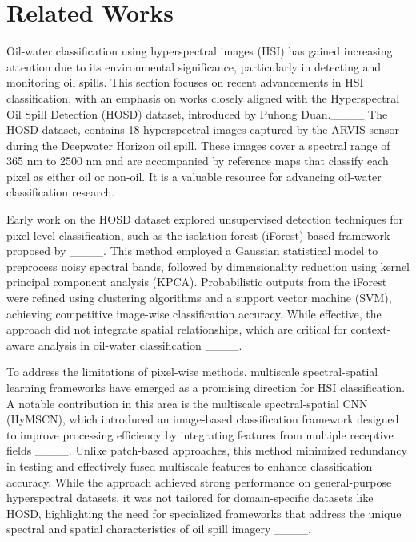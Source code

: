 \section{Related Works}
Oil-water classification using hyperspectral images (HSI) has gained increasing attention due to its environmental significance, particularly in detecting and monitoring oil spills. This section focuses on recent advancements in HSI classification, with an emphasis on works closely aligned with the Hyperspectral Oil Spill Detection (HOSD) dataset, introduced by Puhong Duan.____
\newline
The HOSD dataset, contains 18 hyperspectral images captured by the ARVIS sensor during the Deepwater Horizon oil spill. These images cover a spectral range of 365 nm to 2500 nm and are accompanied by reference maps that classify each pixel as either oil or non-oil. It is a valuable resource for advancing oil-water classification research.

Early work on the HOSD dataset explored unsupervised detection techniques for pixel level classification, such as the isolation forest (iForest)-based framework proposed by ____. This method employed a Gaussian statistical model to preprocess noisy spectral bands, followed by dimensionality reduction using kernel principal component analysis (KPCA). Probabilistic outputs from the iForest were refined using clustering algorithms and a support vector machine (SVM), achieving competitive image-wise classification accuracy. While effective, the approach did not integrate spatial relationships, which are critical for context-aware analysis in oil-water classification ____.

To address the limitations of pixel-wise methods, multiscale spectral-spatial learning frameworks have emerged as a promising direction for HSI classification. A notable contribution in this area is the multiscale spectral-spatial CNN (HyMSCN), which introduced an image-based classification framework designed to improve processing efficiency by integrating features from multiple receptive fields ____. Unlike patch-based approaches, this method minimized redundancy in testing and effectively fused multiscale features to enhance classification accuracy. While the approach achieved strong performance on general-purpose hyperspectral datasets, it was not tailored for domain-specific datasets like HOSD, highlighting the need for specialized frameworks that address the unique spectral and spatial characteristics of oil spill imagery ____.

